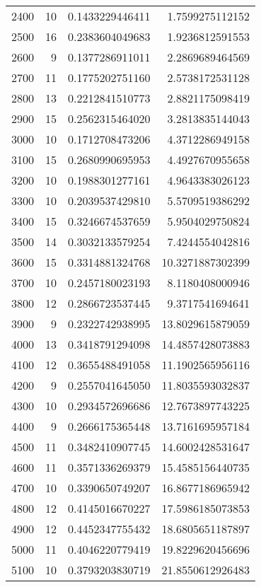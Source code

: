 \begin{longtable}{lrrr}
2400 & 10 & 0.1433229446411 & 1.7599275112152 \\
2500 & 16 & 0.2383604049683 & 1.9236812591553 \\
2600 & 9 & 0.1377286911011 & 2.2869689464569 \\
2700 & 11 & 0.1775202751160 & 2.5738172531128 \\
2800 & 13 & 0.2212841510773 & 2.8821175098419 \\
2900 & 15 & 0.2562315464020 & 3.2813835144043 \\
3000 & 10 & 0.1712708473206 & 4.3712286949158 \\
3100 & 15 & 0.2680990695953 & 4.4927670955658 \\
3200 & 10 & 0.1988301277161 & 4.9643383026123 \\
3300 & 10 & 0.2039537429810 & 5.5709519386292 \\
3400 & 15 & 0.3246674537659 & 5.9504029750824 \\
3500 & 14 & 0.3032133579254 & 7.4244554042816 \\
3600 & 15 & 0.3314881324768 & 10.3271887302399 \\
3700 & 10 & 0.2457180023193 & 8.1180408000946 \\
3800 & 12 & 0.2866723537445 & 9.3717541694641 \\
3900 & 9 & 0.2322742938995 & 13.8029615879059 \\
4000 & 13 & 0.3418791294098 & 14.4857428073883 \\
4100 & 12 & 0.3655488491058 & 11.1902565956116 \\
4200 & 9 & 0.2557041645050 & 11.8035593032837 \\
4300 & 10 & 0.2934572696686 & 12.7673897743225 \\
4400 & 9 & 0.2666175365448 & 13.7161695957184 \\
4500 & 11 & 0.3482410907745 & 14.6002428531647 \\
4600 & 11 & 0.3571336269379 & 15.4585156440735 \\
4700 & 10 & 0.3390650749207 & 16.8677186965942 \\
4800 & 12 & 0.4145016670227 & 17.5986185073853 \\
4900 & 12 & 0.4452347755432 & 18.6805651187897 \\
5000 & 11 & 0.4046220779419 & 19.8229620456696 \\
5100 & 10 & 0.3793203830719 & 21.8550612926483 \\
\end{longtable}
